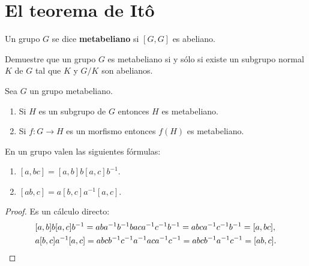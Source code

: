 \chapter{El teorema de It\^o}

\begin{definition}
	Un grupo $G$ se dice \textbf{metabeliano} si $[G,G]$ es abeliano. 
\end{definition}

\begin{exercise}
\label{xca:metabelian1}
	Demuestre que un grupo $G$ es metabeliano si y sólo si existe un subgrupo
	normal $K$ de $G$ tal que $K$ y $G/K$ son abelianos.
\end{exercise}



\begin{exercise}
\label{xca:metabelian2}
	Sea $G$ un grupo metabeliano. 
	\begin{enumerate}
		\item Si $H$ es un subgrupo de $G$ entonces $H$ es metabeliano.
		\item Si $f\colon G\to H$ es un morfismo entonces $f(H)$ es
			metabeliano.
	\end{enumerate}
\end{exercise}

\begin{lemma}
En un grupo valen las siguientes fórmulas:
\begin{enumerate}
	\item $[a,bc]=[a,b]b[a,c]b^{-1}$. 
	\item $[ab,c]=a[b,c]a^{-1}[a,c]$.
\end{enumerate}
\end{lemma}

\begin{proof}
Es un cálculo directo:
 	\begin{align*}
 	&[a,b]b[a,c]b^{-1}=aba^{-1}b^{-1}baca^{-1}c^{-1}b^{-1}=abca^{-1}c^{-1}b^{-1}=[a,bc],\\
 	&a[b,c]a^{-1}[a,c]=abcb^{-1}c^{-1}a^{-1}aca^{-1}c^{-1}=abcb^{-1}a^{-1}c^{-1}=[ab,c].\qedhere
 	\end{align*}
\end{proof}

